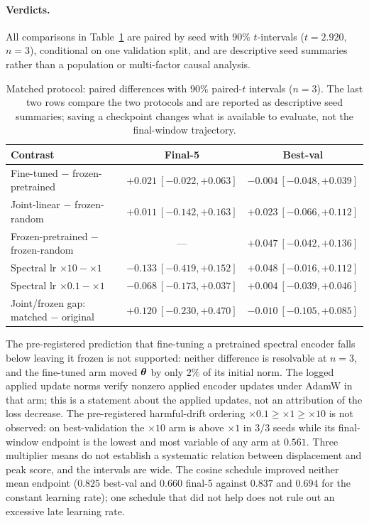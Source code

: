 \paragraph{Verdicts.} All comparisons in Table~\ref{tab:app_verdicts} are
paired by seed with $90\%$ $t$-intervals ($t = 2.920$, $n = 3$), conditional on
one validation split, and are descriptive seed summaries rather than a
population or multi-factor causal analysis.

\begin{table}[htbp]
\centering
\small
\setlength{\tabcolsep}{4pt}
\caption{Matched protocol: paired differences with $90\%$ paired-$t$ intervals
($n = 3$). The last two rows compare the two protocols and are reported as
descriptive seed summaries; saving a checkpoint changes what is available to
evaluate, not the final-window trajectory.}
\label{tab:app_verdicts}
\begin{tabular}{lcc}
\toprule
Contrast & Final-5 & Best-val \\
\midrule
Fine-tuned $-$ frozen-pretrained & $+0.021\ [-0.022, +0.063]$ & $-0.004\ [-0.048, +0.039]$ \\
Joint-linear $-$ frozen-random & $+0.011\ [-0.142, +0.163]$ & $+0.023\ [-0.066, +0.112]$ \\
Frozen-pretrained $-$ frozen-random & --- & $+0.047\ [-0.042, +0.136]$ \\
Spectral lr $\times10 - \times1$ & $-0.133\ [-0.419, +0.152]$ & $+0.048\ [-0.016, +0.112]$ \\
Spectral lr $\times0.1 - \times1$ & $-0.068\ [-0.173, +0.037]$ & $+0.004\ [-0.039, +0.046]$ \\
\midrule
Joint/frozen gap: matched $-$ original & $+0.120\ [-0.230, +0.470]$ & $-0.010\ [-0.105, +0.085]$ \\
\bottomrule
\end{tabular}
\end{table}

The pre-registered prediction that fine-tuning a pretrained spectral encoder
falls below leaving it frozen is not supported: neither difference is
resolvable at $n = 3$, and the fine-tuned arm moved ${\boldsymbol{\theta}}$ by only $2\%$ of
its initial norm. The logged applied update norms verify nonzero applied
encoder updates under AdamW in that arm; this is a statement about the applied
updates, not an attribution of the loss decrease. The pre-registered
harmful-drift ordering $\times0.1 \ge \times1 \ge \times10$ is not observed: on
best-validation the $\times10$ arm is above $\times1$ in $3/3$ seeds while its
final-window endpoint is the lowest and most variable of any arm at $0.561$.
Three multiplier means do not establish a systematic relation between
displacement and peak score, and the intervals are wide. The cosine schedule
improved neither mean endpoint ($0.825$ best-val and $0.660$ final-5 against
$0.837$ and $0.694$ for the constant learning rate); one schedule that did not
help does not rule out an excessive late learning rate.

